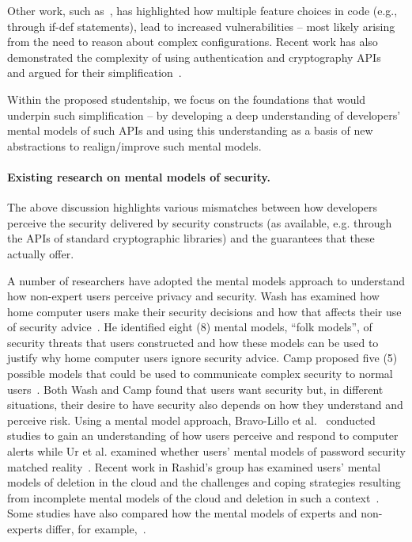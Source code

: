 \documentclass[10pt]{article}
\begin{document}
Other work, such as~\cite{ferreira2016}, has highlighted how multiple feature choices in code (e.g., through if-def statements), lead to increased vulnerabilities -- most likely arising from the need to reason about complex configurations.
Recent work has also demonstrated the complexity of using authentication and cryptography APIs~\cite{acar2017} and argued for their simplification~\cite{arzt2015, nadi2016}. 

\begin{mdframed}
Within the proposed studentship, we focus on the foundations that would underpin such simplification -- by developing a deep understanding of developers' mental models of such APIs and using this understanding as a basis of new abstractions to realign/improve such mental models.
\end{mdframed}

\paragraph{Existing research on mental models of security.}
The above discussion highlights various mismatches between how developers perceive the security delivered by security constructs (as available, e.g. through the APIs of standard cryptographic libraries) and the guarantees that these actually offer. 

A number of researchers have adopted the mental models approach to understand how non-expert users perceive privacy and security. Wash has examined how home computer users make their security decisions and how that affects their use of security advice~\cite{wash2010folk}. He identified eight (8) mental models, ``folk models'', of security threats that users constructed and how these models can be used to justify why home computer users ignore security advice. Camp proposed five (5) possible models that could be used to communicate complex security to normal users~\cite{camp2009mental}. Both Wash and Camp found that users want security but, in different situations, their desire to have security also depends on how they understand and perceive risk. Using a mental model approach, Bravo-Lillo et al.~\cite{bravo2011bridging} conducted studies to gain an understanding of how users perceive and respond to computer alerts while Ur et al. examined whether users' mental models of password security matched reality~\cite{ur2016users}. Recent work in Rashid's group has examined users' mental models of deletion in the cloud and the challenges and coping strategies resulting from incomplete mental models of the cloud and deletion in such a context~\cite{ramokapane2017}. Some studies have also compared how the mental models of experts and non-experts differ, for example,~\cite{ion2015no}. 
\end{document}
